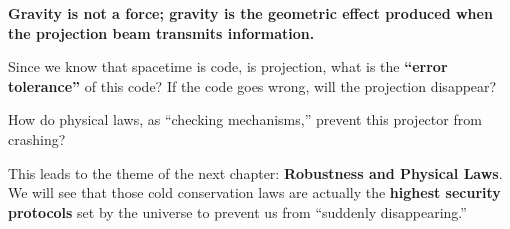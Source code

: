 \textbf{Gravity is not a force; gravity is the geometric effect produced when the projection beam transmits information.}

Since we know that spacetime is code, is projection, what is the \textbf{``error tolerance''} of this code? If the code goes wrong, will the projection disappear?

How do physical laws, as ``checking mechanisms,'' prevent this projector from crashing?

This leads to the theme of the next chapter: \textbf{Robustness and Physical Laws}. We will see that those cold conservation laws are actually the \textbf{highest security protocols} set by the universe to prevent us from ``suddenly disappearing.''

